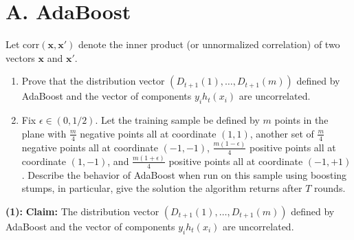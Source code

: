 \documentclass[letterpaper, 11pt]{article}
\newcommand{\1}{\mathds{1}}	%
\theoremstyle{definition}
\begin{document}
\section*{A. AdaBoost}

Let $\text{corr}(\mathbf{x}, \mathbf{x}')$ denote the inner product (or unnormalized correlation) of two vectors $\mathbf{x}$ and $\mathbf{x}'$.

\begin{enumerate}
    \item Prove that the distribution vector $(D_{t+1}(1), \ldots, D_{t+1}(m))$ defined by AdaBoost and the vector of components $y_i h_t(x_i)$ are uncorrelated.
    
    \item Fix $\epsilon \in (0, 1/2)$. Let the training sample be defined by $m$ points in the plane with $\frac{m}{4}$ negative points all at coordinate $(1,1)$, another set of $\frac{m}{4}$ negative points all at coordinate $(-1,-1)$, $\frac{m(1-\epsilon)}{4}$ positive points all at coordinate $(1,-1)$, and $\frac{m(1+\epsilon)}{4}$ positive points all at coordinate $(-1,+1)$. Describe the behavior of AdaBoost when run on this sample using boosting stumps, in particular, give the solution the algorithm returns after $T$ rounds.
\end{enumerate}


\textbf{(1):}
\textbf{Claim:} The distribution vector $(D_{t+1}(1), \ldots, D_{t+1}(m))$ defined by AdaBoost and the vector of components $y_i h_t(x_i)$ are uncorrelated.
\end{document}
